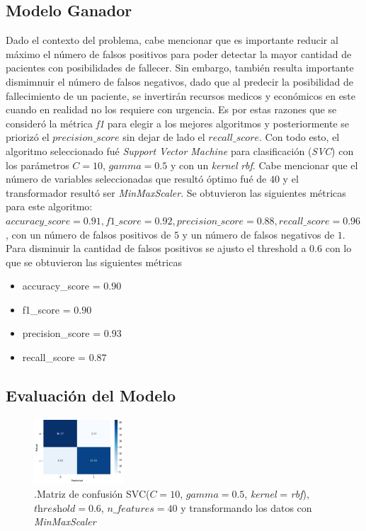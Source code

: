 \documentclass[6pt, twocolumn]{article}
\begin{document}
\subsection{Modelo Ganador}
Dado el contexto del problema, cabe mencionar que es importante reducir al máximo el número de falsos positivos para poder detectar la mayor cantidad de pacientes con posibilidades de fallecer. Sin embargo, también resulta importante dismimnuir el número de falsos negativos, dado que al predecir la posibilidad de fallecimiento de un paciente, se invertirán recursos medicos y económicos en este cuando en realidad no los requiere con urgencia. Es por estas razones que se consideró la métrica \textit{f1} para elegir a los mejores algoritmos y posteriormente se priorizó el \textit{$precision\_score$} sin dejar de lado el \textit{$recall\_score$}. Con todo esto, el algoritmo seleccionado fué \textit{Support Vector Machine} para clasificación (\textit{SVC}) con los parámetros $C = 10$, $gamma = 0.5$ y con un \textit{kernel} \textit{rbf}. Cabe mencionar que el número de variables seleccionadas que resultó óptimo fué de $40$ y el transformador resultó ser \textit{MinMaxScaler}. Se obtuvieron las siguientes métricas para este algoritmo: $accuracy\_score = 0.91, f1\_score = 0.92, precision\_score = 0.88, recall\_score = 0.96$, con un número de falsos positivos de $5$ y un número de falsos negativos de $1$. Para disminuir la cantidad de falsos positivos se ajusto el threshold a $0.6$ con lo que se obtuvieron las siguientes métricas
\begin{itemize}
\item accuracy\_score = $0.90$
\item f1\_score = $0.90$
\item precision\_score = $0.93$
\item recall\_score = $0.87$
\end{itemize}

\subsection{Evaluación del Modelo}
\begin{figure}
\centering
\includegraphics[width = 0.3\textwidth]{./matriz.png}
\caption{\footnotesize \footnotesize \label{fig:matriz}.Matriz de confusión SVC($C = 10$, $gamma = 0.5$, \textit{kernel} = \textit{rbf}), $\textit{threshold} = 0.6$,  $n\_features = 40$ y transformando los datos con \textit{MinMaxScaler}}
\end{figure}
\end{document}
